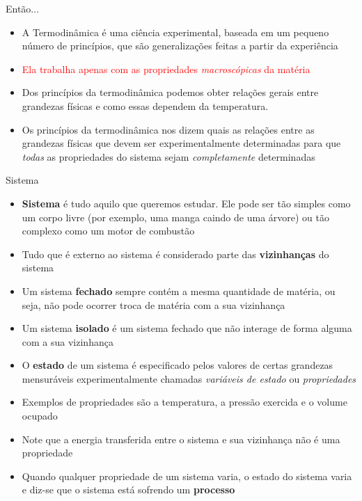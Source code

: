 \begin{frame}{Então...}
    \begin{itemize}
        \item A Termodinâmica é uma ciência experimental, baseada em um pequeno
            número de princípios, que são generalizações feitas a partir da
            experiência
        \item \textcolor{red}{Ela trabalha apenas com as propriedades \textit{macroscópicas} da
            matéria}
        \item Dos princípios da termodinâmica podemos obter relações gerais
            entre grandezas físicas e como essas dependem da temperatura.
        \item Os princípios da termodinâmica nos dizem quais as relações entre as 
            grandezas físicas que devem ser experimentalmente determinadas para que 
            \textit{todas} as propriedades do sistema sejam \textit{completamente} determinadas
    \end{itemize}
\end{frame}

\begin{frame}{Sistema}
    \begin{itemize}
        \item \textbf{Sistema} é tudo aquilo que queremos estudar. Ele pode ser tão simples 
            como um corpo livre (por exemplo, uma manga caindo de uma árvore) ou tão complexo como
            um motor de combustão
        \item Tudo que é externo ao sistema é considerado parte das \textbf{vizinhanças} do sistema
        \item Um sistema \textbf{fechado} sempre contém a mesma quantidade de matéria, ou seja, 
            não pode ocorrer troca de matéria com a sua vizinhança
        \item Um sistema \textbf{isolado} é um sistema fechado que não interage de forma alguma
            com a sua vizinhança
        \item O \textbf{estado} de um sistema é especificado pelos valores de certas grandezas
            mensuráveis experimentalmente chamadas \textit{variáveis de estado} ou \textit{propriedades}
        \item Exemplos de propriedades são a temperatura, a pressão exercida e o volume ocupado
        \item Note que a energia transferida entre o sistema e sua vizinhança não é uma propriedade
        \item Quando qualquer propriedade de um sistema varia, o estado do sistema varia e diz-se que o 
            sistema está sofrendo um \textbf{processo}
    \end{itemize}
\end{frame}

